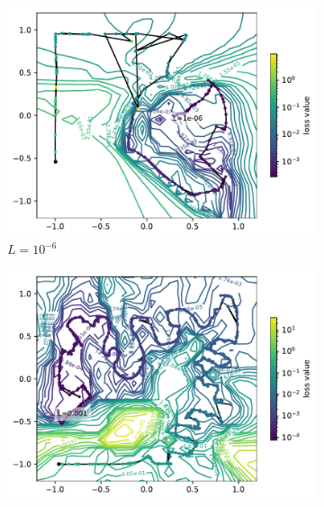 \documentclass[letterpaper]{article} %
\begin{document}
        \begin{figure}[hb]
            \centering
            
            \begin{subfigure}[b]{0.3\textwidth}
                \centering
                \includegraphics[width=\textwidth]{figures/round3/Fails/L_/L-6.pdf}
                \caption{$L=10^{-6}$}
            \end{subfigure}
            \hfill
            \begin{subfigure}[b]{0.3\textwidth}
                \centering
                \includegraphics[width=\textwidth]{figures/round3/Fails/L_/L-3.pdf}

\end{subfigure}
\end{figure}
\end{document}
